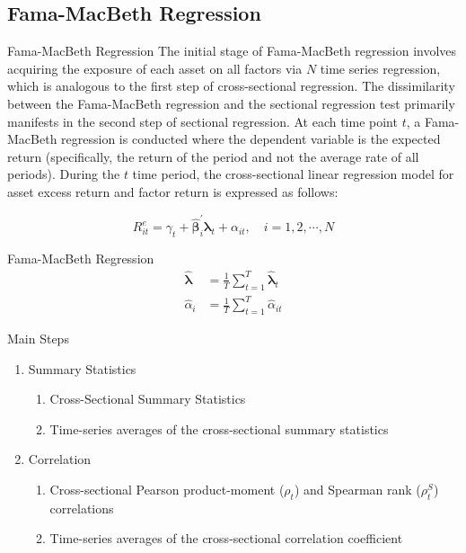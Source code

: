 \documentclass{beamer}
\begin{document}
\subsection{Fama-MacBeth Regression}

\begin{frame}{Fama-MacBeth Regression}
	The initial stage of Fama-MacBeth regression involves acquiring the exposure of each asset on all factors via $N$ time series regression, which is analogous to the first step of cross-sectional regression. The dissimilarity between the Fama-MacBeth regression and the sectional regression test primarily manifests in the second step of sectional regression. At each time point $t$, a Fama-MacBeth regression is conducted where the dependent variable is the expected return (specifically, the return of the period and not the average rate of all periods). During the $t$ time period, the cross-sectional linear regression model for asset excess return and factor return is expressed as follows:

	\begin{equation}
		R_{i t}^e=\gamma_t+\hat{\boldsymbol{\beta}}_i^{\prime} \boldsymbol{\lambda}_t+\alpha_{i t}, \quad i=1,2, \cdots, N
	\end{equation}

\end{frame}

\begin{frame}{Fama-MacBeth Regression}
\begin{equation}
	\begin{aligned}
		\hat{\boldsymbol{\lambda}} & =\frac{1}{T} \sum_{t=1}^T \hat{\boldsymbol{\lambda}}_t \\
		\hat{\alpha}_i & =\frac{1}{T} \sum_{t=1}^T \hat{\alpha}_{i t}
		\end{aligned}
\end{equation}
\end{frame}

\begin{frame}{Main Steps}
	\begin{enumerate}
		\item Summary Statistics
		\begin{enumerate}
			\item Cross-Sectional Summary Statistics
			\item Time-series averages of the cross-sectional summary statistics
		\end{enumerate}
		\item Correlation
		\begin{enumerate}
			\item Cross-sectional Pearson product-moment ($\rho_t$) and Spearman rank ($\rho^S_t$) correlations
			\item Time-series averages of the cross-sectional correlation coefficient
		\end{enumerate}
	\end{enumerate}
\end{frame}
\end{document}
